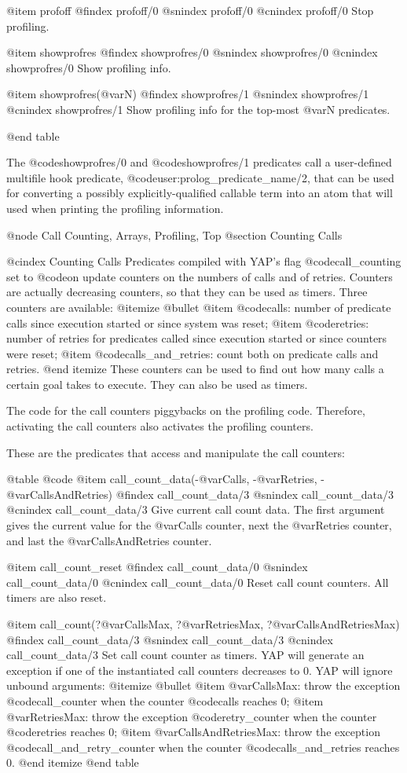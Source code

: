 {{{{{{{@item profoff
@findex profoff/0
@snindex profoff/0
@cnindex profoff/0
Stop profiling.

@item showprofres
@findex showprofres/0
@snindex showprofres/0
@cnindex showprofres/0
Show profiling info.

@item showprofres(@var{N})
@findex showprofres/1
@snindex showprofres/1
@cnindex showprofres/1
Show profiling info for the top-most @var{N} predicates.

@end table

The @code{showprofres/0} and @code{showprofres/1} predicates call a user-defined multifile hook predicate, @code{user:prolog_predicate_name/2}, that can be used for converting a possibly explicitly-qualified callable term into an atom that will used when printing the profiling information.

@node Call Counting, Arrays, Profiling, Top
@section Counting Calls

@cindex Counting Calls
Predicates compiled with YAP's flag @code{call_counting} set to
@code{on} update counters on the numbers of calls and of
retries. Counters are actually decreasing counters, so that they can be
used as timers.  Three counters are available:
@itemize @bullet
@item @code{calls}: number of predicate calls since execution started or since
system was reset; 
@item @code{retries}: number of retries for predicates called since
execution started or since counters were reset;
@item @code{calls_and_retries}: count both on predicate calls and
retries.
@end itemize
These counters can be used to find out how many calls a certain
goal takes to execute. They can also be used as timers.

The code for the call counters piggybacks on the profiling
code. Therefore, activating the call counters also activates the profiling
counters.

These are  the predicates that access and manipulate the call counters:

@table @code
@item call_count_data(-@var{Calls}, -@var{Retries}, -@var{CallsAndRetries})
@findex call_count_data/3
@snindex call_count_data/3
@cnindex call_count_data/3
Give current call count data. The first argument gives the current value
for the @var{Calls} counter, next the @var{Retries} counter, and last
the @var{CallsAndRetries} counter.

@item call_count_reset
@findex call_count_data/0
@snindex call_count_data/0
@cnindex call_count_data/0
Reset call count counters. All timers are also reset.

@item call_count(?@var{CallsMax}, ?@var{RetriesMax}, ?@var{CallsAndRetriesMax})
@findex call_count_data/3
@snindex call_count_data/3
@cnindex call_count_data/3
Set call count counter as timers. YAP will generate an exception
if one of the instantiated call counters decreases to 0. YAP will ignore
unbound arguments:
@itemize @bullet
@item @var{CallsMax}: throw the exception @code{call_counter} when the
counter @code{calls} reaches 0;
@item @var{RetriesMax}: throw the exception @code{retry_counter} when the
counter @code{retries} reaches 0;
@item @var{CallsAndRetriesMax}: throw the exception
@code{call_and_retry_counter} when the counter @code{calls_and_retries}
reaches 0.
@end itemize
@end table

}}}}}}}

